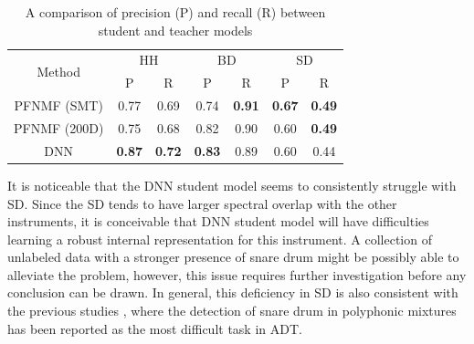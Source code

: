 \documentclass{article}
\begin{document}
\begin{table}
\begin{footnotesize}
\centering
\begin{tabular}{ccccccc}
\hline
\multirow{2}{*}{Method} & \multicolumn{2}{c}{HH}          & \multicolumn{2}{c}{BD}          & \multicolumn{2}{c}{SD}          \\ \cline{2-7} 
                        & P              & R              & P              & R              & P              & R              \\ \hline
PFNMF (SMT)             & 0.77          & 0.69          & 0.74          & \textbf{0.91} & \textbf{0.67} & \textbf{0.49} \\
PFNMF (200D)            & 0.75          & 0.68          & 0.82          & 0.90          & 0.60          & \textbf{0.49}          \\
DNN                     & \textbf{0.87} & \textbf{0.72} & \textbf{0.83} & 0.89          & 0.60          & 0.44          \\ \hline
\end{tabular}
\caption{A comparison of precision (P) and recall (R) between student and teacher models}
\label{tab:pr_comp}
\end{footnotesize}
\end{table}


It is noticeable that the DNN student model seems to consistently struggle with SD. Since the SD tends to have larger spectral overlap with the other instruments, it is conceivable that DNN student model will have difficulties learning a robust internal representation for this instrument. A collection of unlabeled data with a stronger presence of snare drum might be possibly able to alleviate the problem, however, this issue requires further investigation before any conclusion can be drawn. In general, this deficiency in SD is also consistent with the previous studies \cite{Paulus2009a, Wu2015a, Southall2016, Vogl2016}, where the detection of snare drum in polyphonic mixtures has been reported as the most difficult task in ADT. %
\end{document}
